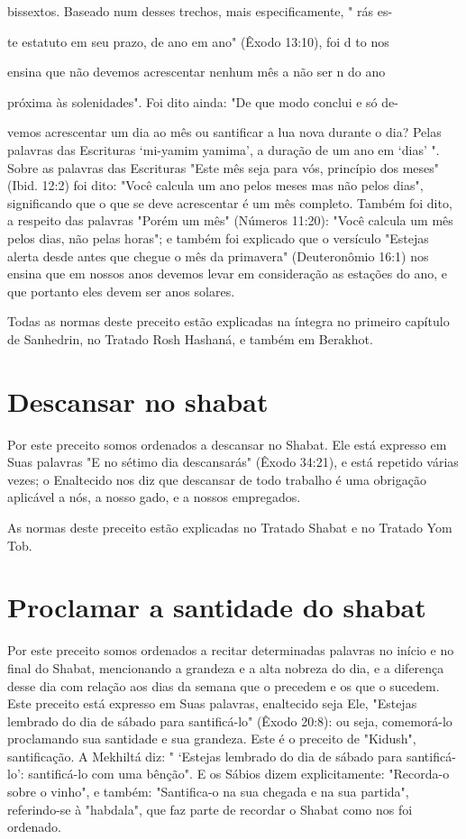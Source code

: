 \begin{itemize}
\begin{enumrate}
\begin{itemize}
\begin{itemize}
\begin{itemize}
bissextos. Baseado num desses trechos, mais especificamente, " rás es-

te estatuto em seu prazo, de ano em ano" (Êxodo 13:10), foi d to nos

ensina que não devemos acrescentar nenhum mês a não ser n do ano

próxima às solenidades". Foi dito ainda: "De que modo conclui e só de-

vemos acrescentar um dia ao mês ou santificar a lua nova durante o dia?
Pelas palavras das Escrituras `mi-yamim yamima', a duração de um ano em
`dias' ". Sobre as palavras das Escrituras "Este mês seja para vós,
princípio dos meses" (Ibid. 12:2) foi dito: "Você calcula um ano pelos
meses mas não pelos dias", significando que o que se deve acrescentar é
um mês completo. Também foi dito, a respeito das palavras "Porém um mês"
(Números 11:20): "Você calcula um mês pelos dias, não pelas horas"; e
também foi explicado que o versículo "Estejas alerta desde antes que
chegue o mês da primavera" (Deuteronômio 16:1) nos ensina que em nossos
anos devemos levar em consideração as esta­ções do ano, e que portanto
eles devem ser anos solares.

Todas as normas deste preceito estão explicadas na íntegra no pri­meiro
capítulo de Sanhedrin, no Tratado Rosh Hashaná, e também em Berakhot.

\section{Descansar no shabat}

Por este preceito somos ordenados a descansar no Shabat. Ele está
expresso em Suas palavras "E no sétimo dia descansarás" (Êxodo 34:21), e
está repetido várias vezes; o Enaltecido nos diz que descansar de todo
trabalho é uma obrigação aplicável a nós, a nosso gado, e a nossos
empregados.

As normas deste preceito estão explicadas no Tratado Shabat e no Tratado
Yom Tob.

\section{Proclamar a santidade do shabat}

Por este preceito somos ordenados a recitar determinadas palavras no
início e no final do Shabat, mencionando a grandeza e a alta nobreza do
dia, e a diferença desse dia com relação aos dias da semana que o
precedem e os que o sucedem. Este preceito está expresso em Suas
palavras, enaltecido seja Ele, "Estejas lembrado do dia de sábado para
santificá-lo" (Êxodo 20:8): ou seja, comemorá-lo proclamando sua
santidade e sua grandeza. Este é o pre­ceito de "Kidush", santificação.
A Mekhiltá diz: " `Estejas lembrado do dia de sábado para santificá-lo':
santificá-lo com uma bênção". E os Sábios dizem ex­plicitamente:
"Recorda-o sobre o vinho", e também: "Santifica-o na sua chega­da e na
sua partida", referindo-se à "habdala", que faz parte de recordar o
Sha­bat como nos foi ordenado.



\end{itemize}
\end{itemize}
\end{itemize}
\end{enumrate}
\end{itemize}
